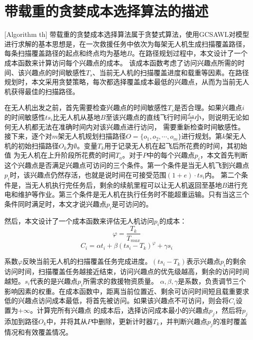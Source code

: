 \section{带载重的贪婪成本选择算法的描述}[Algorithm th]
带载重的贪婪成本选择算法属于贪婪式算法，使用GCSAWL对模型进行求解的基本思想是，在一次救援任务中依次为每架无人机生成扫描覆盖路径，每条扫描覆盖路径的起点和终点均为基地$B$。在路径规划过程中，本文设计了一个成本函数来计算访问每个兴趣点的成本。
该成本函数考虑了访问兴趣点所需的时间、该兴趣点的时间敏感性$T_s$、当前无人机的扫描覆盖进度和载重等因素。在路径规划时，本文采用贪婪策略，每次都选择覆盖成本最低的兴趣点，从而为当前无人机获得最佳的扫描路径。


在无人机出发之前，首先需要检查兴趣点的时间敏感性$T_s$是否合理。如果兴趣点$i$的时间敏感性$ts_i$比无人机从基地$B$至该兴趣点的直线飞行时间$\frac{d_{iB}}{v}$小，则说明无论如何无人机都无法在准确时间内对该兴趣点进行访问，
需要重新检查时间敏感性。接下来，逐个对$m$架无人机规划扫描路径$O=\lbrace o_1, o_2, \cdots ,o_m \rbrace$进行规划。第$k$架无人机的初始扫描路径$O_k$为$\emptyset$。变量$T_k$用于记录无人机在起飞后所花费的时间，其初始值
为无人机在上升阶段所花费的时间$T_a$。对于$P$中的每个兴趣点$p_i$，本文首先判断这个兴趣点是否满足兴趣点可访问的三个条件。第一个条件是当无人机飞到兴趣点$p_i$时，该兴趣点仍然存活，也就是说时间在可接受范围$(1+e) \cdot ts_i$内。
第二个条件是，当无人机执行完任务后，剩余的续航里程可以让无人机返回至基地$B$进行充电和维护等作业。第三个条件是无人机在执行任务时不能超重运输。只有当这三个条件同时满足时，本文才说兴趣点$p_i$是可访问的。


然后，本文设计了一个成本函数来评估无人机访问$p_i$的成本：
\begin{equation}
	\varphi = \frac{T_k}{T_{max}}
\end{equation}
\begin{equation}
	C_i = \alpha t_i + \beta (ts_i - T_k)^\varphi + \gamma s_i
\end{equation}

系数$\varphi$反映当前无人机的扫描覆盖任务完成进度。$(ts_i - T_k)$表示兴趣点$p_i$的剩余访问时间，扫描覆盖任务越接近结束，访问兴趣点的优先级越高，剩余的访问时间越短。$s_i$代表的是兴趣点$p_i$所需求的救援物资质量。
$\alpha,\beta,\gamma$是系数，负责调节三个影响因素的权重。在成本函数中，距离当前位置近、剩余可访问时间短且载重要求低的兴趣点访问成本最低，将首先被访问。如果该兴趣点不可访问，则会将$C_i$设置为$+\infty$。计算完所有兴趣点
的成本后，选择访问成本最小的兴趣点$p_j$，然后将$p_j$添加到路径$O_k$中，并将其从$P$中删除，更新计时器$T_k$，并判断兴趣点$p_j$的准时覆盖情况和有效覆盖情况。



